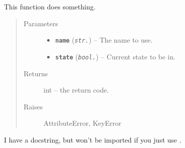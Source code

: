 \documentclass[letterpaper,10pt,english]{sphinxmanual}
\begin{document}
\begin{fulllineitems}
\label{code:an_example_pypi_project.useful_2.public_fn_with_sphinxy_docstring}
This function does something.
\begin{quote}\begin{description}
\item[{Parameters}] \leavevmode\begin{itemize}
\item {} 
\textbf{\texttt{name}} (\emph{\texttt{str.}}) -- The name to use.

\item {} 
\textbf{\texttt{state}} (\emph{\texttt{bool.}}) -- Current state to be in.

\end{itemize}

\item[{Returns}] \leavevmode
int -- the return code.

\item[{Raises}] \leavevmode
AttributeError, KeyError

\end{description}\end{quote}

\end{fulllineitems}


\begin{fulllineitems}
\label{code:an_example_pypi_project.useful_2._private_fn_with_docstring}
I have a docstring, but won't be imported if you just use .

\end{fulllineitems}

\end{document}
